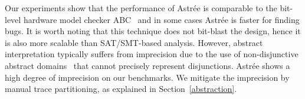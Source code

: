 Our experiments show that the performance of Astr{\'e}e is comparable to the
bit-level hardware model checker ABC~\cite{abc} and in some cases Astr{\'e}e
is faster for finding bugs.  It is worth noting that this technique does not
bit-blast the design, hence it is also more scalable than SAT/SMT-based
analysis.  However, abstract interpretation typically suffers from
imprecision due to the use of non-disjunctive abstract domains~\cite{nd}
that cannot precisely represent disjunctions.  Astr{\'e}e shows a high
degree of imprecision on our benchmarks.  We mitigate the imprecision by
manual trace partitioning, as explained in Section~\ref{abstraction}.

